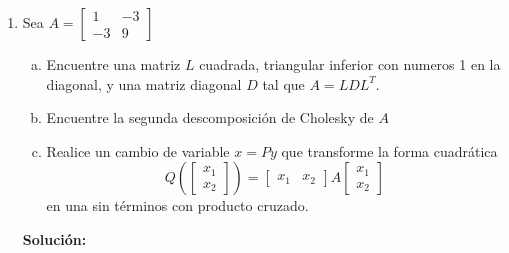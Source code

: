 \documentclass[12pt]{article}
\newenvironment{solucion}
{\begin{mdframed}[backgroundcolor=black!10]
		{\bf Solución:}\\
	}
	{
	\end{mdframed}
}
\newenvironment{preguntas}
{\begin{enumerate}\itemsep12pt
	}
	{
	\end{enumerate}
}
\begin{document}
\begin{preguntas}
\begin{solucion}
\begin{enumerate}[a)]
$$x^TAx = (Py)^TA(Py) = y^TP^TAPy = y^TDy$$
Donde $D$ también era la matriz diagonal de la diagonalización ortogonal de $A$, por lo que
$$D = \begin{bmatrix}
3 & 0 & 0 \\
0 & 9 & 0 \\
0 & 0 & 15
\end{bmatrix}$$
Por lo tanto, como todos los elementos de la diagonal son positivos, la forma cuadrática es positiva definida.
\end{enumerate}
\end{solucion}
\item Sea $A = \begin{bmatrix}1 & -3 \\ -3 & 9\end{bmatrix}$
\begin{enumerate}[a)]
\item Encuentre una matriz $L$ cuadrada, triangular inferior con numeros 1 en la diagonal, y una matriz diagonal $D$ tal que $A = LDL^T$.
\item Encuentre la segunda descomposición de Cholesky de $A$
\item Realice un cambio de variable $x=Py$ que transforme la forma cuadrática
		$$Q\left(\begin{bmatrix}x_1\\x_2\end{bmatrix}\right) = \begin{bmatrix}x_1& x_2\end{bmatrix}A\begin{bmatrix}x_1\\ x_2\end{bmatrix}$$
		en una sin términos con producto cruzado.
\end{enumerate}
\begin{solucion}


\end{solucion}
\end{preguntas}
\end{document}
